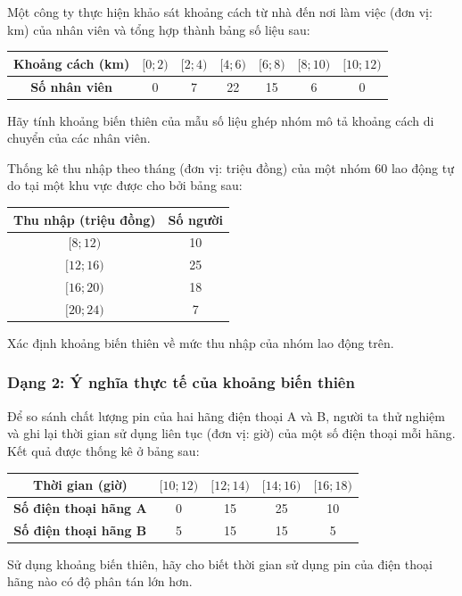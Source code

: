 \documentclass[12pt]{article}
\begin{document}
	\begin{btdo}[title={Bài 5}]
		Một công ty thực hiện khảo sát khoảng cách từ nhà đến nơi làm việc (đơn vị: km) của nhân viên và tổng hợp thành bảng số liệu sau:
		\begin{center}
			\renewcommand{\arraystretch}{1.3}
			\begin{tabular}{|c|c|c|c|c|c|c|}
				\hline
				\textbf{Khoảng cách (km)} & $[0; 2)$ & $[2; 4)$ & $[4; 6)$ & $[6; 8)$ & $[8; 10)$ & $[10; 12)$ \\
				\hline
				\textbf{Số nhân viên} & 0 & 7 & 22 & 15 & 6 & 0 \\
				\hline
			\end{tabular}
		\end{center}
		Hãy tính khoảng biến thiên của mẫu số liệu ghép nhóm mô tả khoảng cách di chuyển của các nhân viên.
	\end{btdo}
	
	\begin{btdo}[title={Bài 6}]
		Thống kê thu nhập theo tháng (đơn vị: triệu đồng) của một nhóm 60 lao động tự do tại một khu vực được cho bởi bảng sau:
		\begin{center}
			\renewcommand{\arraystretch}{1.3}
			\begin{tabular}{|c|c|}
				\hline
				\textbf{Thu nhập (triệu đồng)} & \textbf{Số người} \\
				\hline
				$[8; 12)$ & 10 \\
				\hline
				$[12; 16)$ & 25 \\
				\hline
				$[16; 20)$ & 18 \\
				\hline
				$[20; 24)$ & 7 \\
				\hline
			\end{tabular}
		\end{center}
		Xác định khoảng biến thiên về mức thu nhập của nhóm lao động trên.
	\end{btdo}
	
	\subsubsection{Dạng 2: Ý nghĩa thực tế của khoảng biến thiên}
	
	\begin{btxanh}[title={Bài 1}]
		Để so sánh chất lượng pin của hai hãng điện thoại A và B, người ta thử nghiệm và ghi lại thời gian sử dụng liên tục (đơn vị: giờ) của một số điện thoại mỗi hãng. Kết quả được thống kê ở bảng sau:
		\begin{center}
			\renewcommand{\arraystretch}{1.3}
			\begin{tabular}{|c|c|c|c|c|}
				\hline
				\textbf{Thời gian (giờ)} & $[10; 12)$ & $[12; 14)$ & $[14; 16)$ & $[16; 18)$ \\
				\hline
				\textbf{Số điện thoại hãng A} & 0 & 15 & 25 & 10 \\
				\hline
				\textbf{Số điện thoại hãng B} & 5 & 15 & 15 & 5 \\
				\hline
			\end{tabular}
		\end{center}
		Sử dụng khoảng biến thiên, hãy cho biết thời gian sử dụng pin của điện thoại hãng nào có độ phân tán lớn hơn.
	\end{btxanh}
	
\end{document}
